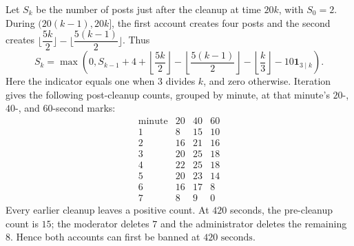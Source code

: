 Let $S_k$ be the number of posts just after the cleanup at time $20k$, with $S_0=2$. During $(20(k-1),20k]$, the first account creates four posts and the second creates $\lfloor\dfrac{5k}{2}\rfloor-\lfloor\dfrac{5(k-1)}{2}\rfloor$. Thus\[S_k=\max\left(0,S_{k-1}+4+\left\lfloor\dfrac{5k}{2}\right\rfloor-\left\lfloor\dfrac{5(k-1)}{2}\right\rfloor-\left\lfloor\dfrac{k}{3}\right\rfloor-10\mathbf1_{3\mid k}\right).\]Here the indicator equals one when $3$ divides $k$, and zero otherwise. Iteration gives the following post-cleanup counts, grouped by minute, at that minute's $20$-, $40$-, and $60$-second marks:\[\begin{array}{c|rrr}\text{minute}&20&40&60\\\hline1&8&15&10\\2&16&21&16\\3&20&25&18\\4&22&25&18\\5&20&23&14\\6&16&17&8\\7&8&9&0\end{array}\]Every earlier cleanup leaves a positive count. At $420$ seconds, the pre-cleanup count is $15$; the moderator deletes $7$ and the administrator deletes the remaining $8$. Hence both accounts can first be banned at $\boxed{420\text{ seconds}}$.
